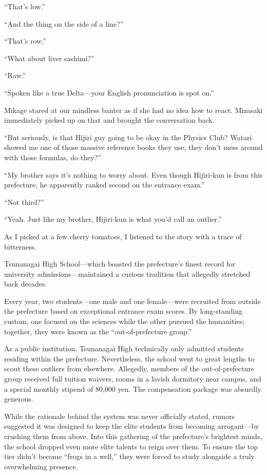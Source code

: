 \documentclass[
    a4paper,
    12pt,
    twoside,
    openany,
    UTF8,
    fontset=windows
]{ctexbook}
\begin{document}
``That's low.''

``And the thing on the side of a line?''

``That's row.''

``What about liver sashimi?''

``Raw.''

``Spoken like a true Delta---your English pronunciation is spot on.''

Mikage stared at our mindless banter as if she had no idea how to react. Mizasaki immediately picked up on that and brought the conversation back.

``But seriously, is that Hijiri guy going to be okay in the Physics Club? Watari showed me one of those massive reference books they use; they don't mess around with those formulas, do they?''

``My brother says it's nothing to worry about. Even though Hijiri-kun is from this prefecture, he apparently ranked second on the entrance exam.''

``Not third?''

``Yeah. Just like my brother, Hijiri-kun is what you'd call an outlier.''

As I picked at a few cherry tomatoes, I listened to the story with a trace of bitterness.

Tsunanagai High School---which boasted the prefecture's finest record for university admissions---maintained a curious tradition that allegedly stretched back decades.

Every year, two students---one male and one female---were recruited from outside the prefecture based on exceptional entrance exam scores. By long-standing custom, one focused on the sciences while the other pursued the humanities; together, they were known as the ``out-of-prefecture group.''

As a public institution, Tsunanagai High technically only admitted students residing within the prefecture. Nevertheless, the school went to great lengths to scout these outliers from elsewhere. Allegedly, members of the out-of-prefecture group received full tuition waivers, rooms in a lavish dormitory near campus, and a special monthly stipend of 80,000 yen. The compensation package was absurdly generous.

While the rationale behind the system was never officially stated, rumors suggested it was designed to keep the elite students from becoming arrogant---by crushing them from above. Into this gathering of the prefecture's brightest minds, the school dropped even more elite talents to reign over them. To ensure the top tier didn't become ``frogs in a well,'' they were forced to study alongside a truly overwhelming presence.
\end{document}
